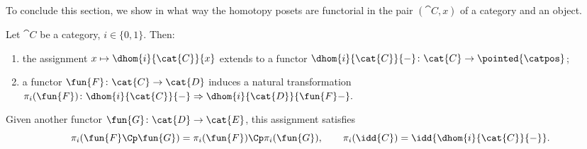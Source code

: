 %
%
%

To conclude this section, we show in what way the homotopy posets are functorial in the pair $(\cat{C}, x)$ of a category and an object.

\begin{proposition} \label{prop: Homotopy posets are functorial}
Let $\cat{C}$ be a category, $i \in \{0, 1\}$.
Then:
\begin{enumerate}
    \item the assignment $x \mapsto \dhom{i}{\cat{C}}{x}$ extends to a functor
        $\dhom{i}{\cat{C}}{-}\colon \cat{C} \to \pointed{\catpos}$;
    \item a functor $\fun{F}\colon \cat{C} \to \cat{D}$ induces a natural transformation 
        $\pi_i(\fun{F})\colon \dhom{i}{\cat{C}}{-} \Rightarrow \dhom{i}{\cat{D}}{\fun{F}-}.$
\end{enumerate}
Given another functor $\fun{G}\colon \cat{D} \to \cat{E}$,  this assignment satisfies
\begin{equation*}
    \pi_i(\fun{F}\Cp \fun{G}) = \pi_i(\fun{F}) \Cp \pi_i(\fun{G}), \quad \quad \pi_i(\idd{C}) = \idd{\dhom{i}{\cat{C}}{-}}.
\end{equation*}
\end{proposition}


